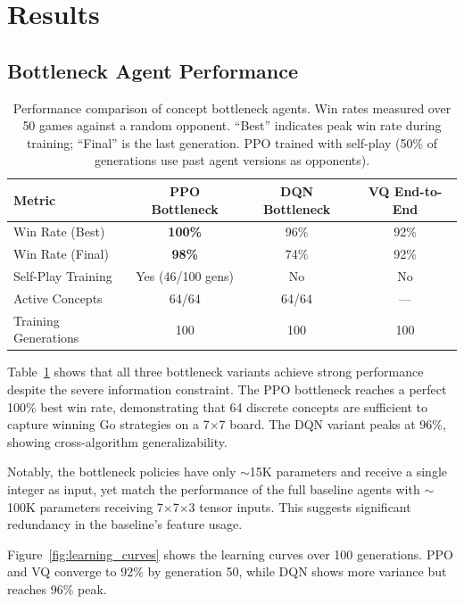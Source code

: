 \documentclass[11pt,a4paper]{article}
\begin{document}
\section{Results}

\subsection{Bottleneck Agent Performance}

\begin{table}[t]
\centering
\caption{Performance comparison of concept bottleneck agents. Win rates measured over 50 games against a random opponent. ``Best'' indicates peak win rate during training; ``Final'' is the last generation. PPO trained with self-play (50\% of generations use past agent versions as opponents).}
\label{tab:performance}
\begin{tabular}{lccc}
\toprule
\textbf{Metric} & \textbf{PPO Bottleneck} & \textbf{DQN Bottleneck} & \textbf{VQ End-to-End} \\
\midrule
Win Rate (Best)       & \textbf{100\%} & 96\%  & 92\% \\
Win Rate (Final)      & \textbf{98\%}  & 74\%  & 92\% \\
Self-Play Training    & Yes (46/100 gens) & No & No \\
Active Concepts       & 64/64 & 64/64 & ---  \\
Training Generations  & 100   & 100   & 100  \\
\bottomrule
\end{tabular}
\end{table}

Table~\ref{tab:performance} shows that all three bottleneck variants achieve strong performance despite the severe information constraint. The PPO bottleneck reaches a perfect 100\% best win rate, demonstrating that 64 discrete concepts are sufficient to capture winning Go strategies on a 7$\times$7 board. The DQN variant peaks at 96\%, showing cross-algorithm generalizability.

Notably, the bottleneck policies have only $\sim$15K parameters and receive a single integer as input, yet match the performance of the full baseline agents with $\sim$100K parameters receiving 7$\times$7$\times$3 tensor inputs. This suggests significant redundancy in the baseline's feature usage.

Figure~\ref{fig:learning_curves} shows the learning curves over 100 generations. PPO and VQ converge to 92\% by generation 50, while DQN shows more variance but reaches 96\% peak.
\end{document}
